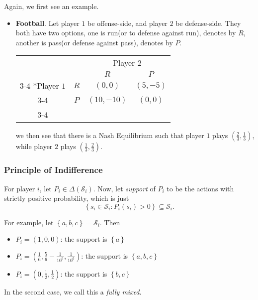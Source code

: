 \begin{eg}
	Again, we first see an example.
	\begin{itemize}
		\item \label{Football}\textbf{Football}. Let player \(1\) be offense-side, and player \(2\) be defense-side. They both have two options, one is
		      run(or to defense against run), denotes by \(R\),  another is pass(or defense against pass), denotes by \(P\).
		      \begin{table}[H]
			      \centering
			      \setlength{\extrarowheight}{2pt}
			      \begin{tabular}{cc|c|c|}
				                                & \multicolumn{1}{c}{} & \multicolumn{2}{c}{Player $2$}                           \\
				                                & \multicolumn{1}{c}{} & \multicolumn{1}{c}{$R$}        & \multicolumn{1}{c}{$P$} \\\cline{3-4}
				      \multirow{2}*{Player $1$} & $R$                  & $(0, 0)$                       & $(5, -5)$               \\\cline{3-4}
				                                & $P$                  & $(10, -10)$                    & $(0, 0)$                \\\cline{3-4}
			      \end{tabular}
		      \end{table}
		      we then see that there is a Nash Equilibrium such that player \(1\) plays \((\frac{2}{3}, \frac{1}{3})\), while player \(2\) plays
		      \((\frac{1}{3}, \frac{2}{3})\).
	\end{itemize}
\end{eg}

\subsubsection{Principle of Indifference}
For player \(i\), let \(P_i\in \Delta(\mathcal{S}_{i})\). Now, let \emph{support} of \(P_{i}\) to be the actions with strictly positive probability,
which is just
\[
	\left\{s_{i}\in \mathcal{S}_{i}\colon P_{i}(s_{i})>0\right\}\subseteq \mathcal{S}_{i}.
\]

\begin{eg}
	For example, let \(\left\{a, b, c\right\} = \mathcal{S}_{i}\). Then
	\begin{itemize}
		\item \(P_{i} = (1, 0, 0)\): the support is \(\left\{a\right\}\)
		\item \(P_{i} = (\frac{1}{6}, \frac{5}{6} - \frac{1}{10^6}, \frac{1}{10^6})\): the support is \(\left\{a, b, c\right\}\)
		\item \(P_{i} = (0, \frac{1}{2}, \frac{1}{2})\): the support is \(\left\{b, c\right\}\)
	\end{itemize}
	\begin{note}
		In the second case, we call this a \emph{fully mixed}.
	\end{note}
\end{eg}

